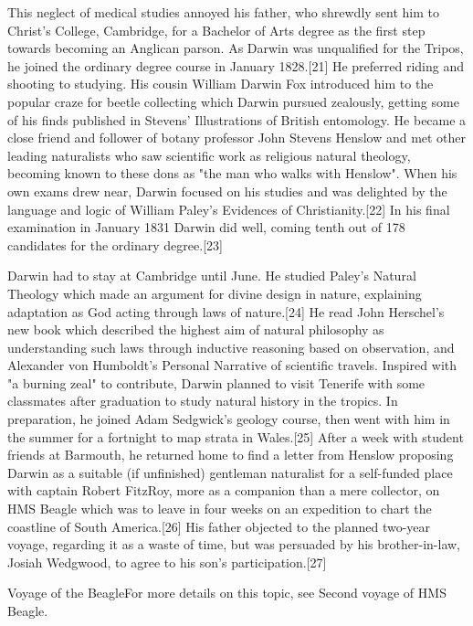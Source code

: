 \documentclass{article}
\begin{document}
This neglect of medical studies annoyed his father, who shrewdly sent him to Christ's College, Cambridge, for a Bachelor of Arts degree as the first step towards becoming an Anglican parson. As Darwin was unqualified for the Tripos, he joined the ordinary degree course in January 1828.[21] He preferred riding and shooting to studying. His cousin William Darwin Fox introduced him to the popular craze for beetle collecting which Darwin pursued zealously, getting some of his finds published in Stevens' Illustrations of British entomology. He became a close friend and follower of botany professor John Stevens Henslow and met other leading naturalists who saw scientific work as religious natural theology, becoming known to these dons as "the man who walks with Henslow". When his own exams drew near, Darwin focused on his studies and was delighted by the language and logic of William Paley's Evidences of Christianity.[22] In his final examination in January 1831 Darwin did well, coming tenth out of 178 candidates for the ordinary degree.[23]

Darwin had to stay at Cambridge until June. He studied Paley's Natural Theology which made an argument for divine design in nature, explaining adaptation as God acting through laws of nature.[24] He read John Herschel's new book which described the highest aim of natural philosophy as understanding such laws through inductive reasoning based on observation, and Alexander von Humboldt's Personal Narrative of scientific travels. Inspired with "a burning zeal" to contribute, Darwin planned to visit Tenerife with some classmates after graduation to study natural history in the tropics. In preparation, he joined Adam Sedgwick's geology course, then went with him in the summer for a fortnight to map strata in Wales.[25] After a week with student friends at Barmouth, he returned home to find a letter from Henslow proposing Darwin as a suitable (if unfinished) gentleman naturalist for a self-funded place with captain Robert FitzRoy, more as a companion than a mere collector, on HMS Beagle which was to leave in four weeks on an expedition to chart the coastline of South America.[26] His father objected to the planned two-year voyage, regarding it as a waste of time, but was persuaded by his brother-in-law, Josiah Wedgwood, to agree to his son's participation.[27]

Voyage of the BeagleFor more details on this topic, see Second voyage of HMS Beagle.
 
\end{document}
